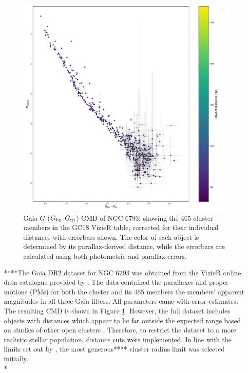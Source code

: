 \documentclass[12pt, a4paper]{report}
\begin{document}
\begin{figure}[h!]
\begin{center}
\includegraphics[width=1.0\textwidth]{../NGC_6793_CMD_observational_errorbars_vizier_465.pdf}
\caption{Gaia $G$-($G_{\textnormal{bp}}$-$G_{\textnormal{rp}}$) CMD of NGC 6793, showing the 465 cluster members in the GC18 VizieR table, corrected for their individual distances with errorbars shown. The color of each object is determined by its parallax-derived distance, while the errorbars are calculated using both photometric and parallax errors.}
\label{NGC_6793_obs_only_465}
\end{center}
\end{figure}

****The Gaia DR2 dataset for NGC 6793 was obtained from the VizieR online data catalogue provided by \cite{2018A&A...616A..10G}. The data contained the parallaxes and proper motions (PMs) for both the cluster and its 465 members the members' apparent magnitudes in all three Gaia filters. All parameters came with error estimates. The resulting CMD is shown in Figure \ref{NGC_6793_obs_only_465}. However, the full dataset includes objects with distances which appear to lie far outside the expected range based on studies of other open clusters \citep{2006A&A...456..523S}. Therefore, to restrict the dataset to a more realistic stellar population, distance cuts were implemented. In line with the limits set out by \cite{2006A&A...456..523S}, the most generous**** cluster radius limit was selected initially.\\*
\end{document}
